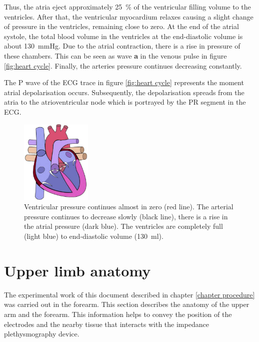 Thus, the atria eject approximately \SI{25}{\percent} of the ventricular filling volume to the ventricles. After that, the ventricular myocardium relaxes causing a slight change of pressure in the ventricles, remaining close to zero. At the end of the atrial systole, the total blood volume in the ventricles at the end-diastolic volume is about \SI{130}{\mmHg}. Due to the atrial contraction, there is a rise in pressure of these chambers. This can be seen as wave \textbf{a} in the venous pulse in figure \ref{fig:heart cycle}. Finally, the arteries pressure continues decreasing constantly.

The P wave of the ECG trace in figure \ref{fig:heart cycle} represents the moment atrial depolarisation occurs. Subsequently, the depolarisation spreads from the atria to the atrioventricular node which is portrayed by the PR segment in the ECG.

\begin{figure}[!htpb]
		\centering
		\includegraphics[height=4cm,keepaspectratio]{figure_17}
		\caption[Heart's chambers movement during Atrial systole]{Ventricular pressure continues almost in zero (red line). The arterial pressure continues to decrease slowly (black line), there is a rise in the atrial pressure (dark blue). The ventricles are completely full (light blue) to end-diastolic volume (\SI{130}{\milli\litre}).}
		\label{fig:heart atrial systole}
\end{figure}

 
\section{Upper limb anatomy}
\label{section literature anatomy}
The experimental work of this document described in chapter \ref{chapter procedure} was carried out in the forearm. This section describes the anatomy of the upper arm and the forearm. This information helps to convey the position of the electrodes and the nearby tissue that interacts with the impedance plethysmography device. 

